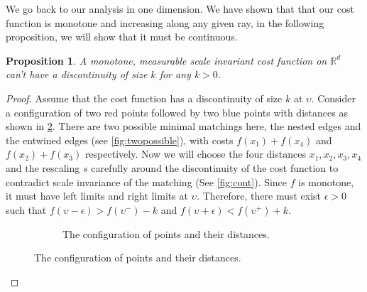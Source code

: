 \documentclass{article}
\newcommand{\eek}{\upsilon}
\newtheorem{proposition}{Proposition}
\begin{document}

We go back to our analysis in one dimension. We have shown that that our cost
function is monotone and increasing along any given ray, in the following
proposition, we will show that it must be continuous.


\begin{proposition}\label{thm:continuous}
  A monotone, measurable scale invariant cost function on
  $\mathbb{R}^d$ can't have a discontinuity of size $k$ for any $k>
  0$.
\end{proposition}

\begin{proof}
  Assume that the cost function has a discontinuity of size $k$ at  $\eek$.
  Consider a configuration of two red points followed by two blue
  points with distances as shown in \cref{fig:pts4cont}.
    There are two possible minimal matchings here,
  the nested edges and the entwined edges
 (see \cref{fig:twopossible}), with costs $f(x_1)
  +f(x_4)$ and $f(x_2)+f(x_3)$ respectively.
  Now we will choose the four distances $x_1,x_2,x_3,x_4$ and the
  rescaling $s$ carefully around the discontinuity of the cost
  function to contradict scale invariance of the matching (See \cref{fig:cont}).
Since $f$ is monotone, it must have left limits and right limits
  at $\eek$. Therefore, there must exist  $\epsilon>0$ such that $f(\eek-\epsilon) >
  f(\eek^-)-k$ and $f(\eek+\epsilon)<f(\eek^+)+k$.

  \begin{figure}
    \centering
    \begin{subfigure}{0.9\textwidth}
      \centering
  \caption{The configuration of points and their distances.} \label{fig:pts4cont}
\end{subfigure}


\end{figure}
\end{proof}
\end{document}
